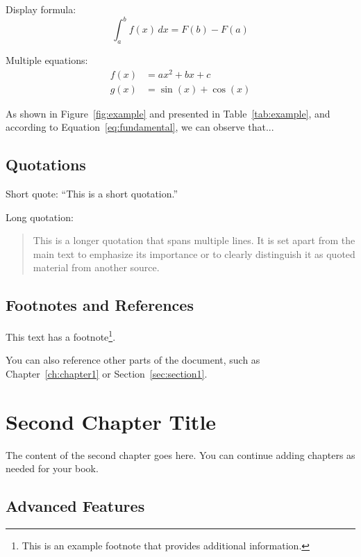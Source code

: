 \documentclass[12pt,a4paper,oneside]{book}
\begin{document}
Display formula:
\begin{equation}
\int_{a}^{b} f(x) \, dx = F(b) - F(a)
\label{eq:fundamental}
\end{equation}

Multiple equations:
\begin{align}
f(x) &= ax^2 + bx + c \label{eq:quadratic} \\
g(x) &= \sin(x) + \cos(x) \label{eq:trigonometric}
\end{align}

As shown in Figure~\ref{fig:example} and presented in Table~\ref{tab:example}, and according to Equation~\ref{eq:fundamental}, we can observe that...

\section{Quotations}

Short quote: \enquote{This is a short quotation.}

Long quotation:
\begin{quote}
This is a longer quotation that spans multiple lines. It is set apart from the main text to emphasize its importance or to clearly distinguish it as quoted material from another source.
\end{quote}

\section{Footnotes and References}

This text has a footnote\footnote{This is an example footnote that provides additional information.}.

You can also reference other parts of the document, such as Chapter~\ref{ch:chapter1} or Section~\ref{sec:section1}.

\chapter{Second Chapter Title}
\label{ch:chapter2}

The content of the second chapter goes here. You can continue adding chapters as needed for your book.

\section{Advanced Features}
\end{document}

